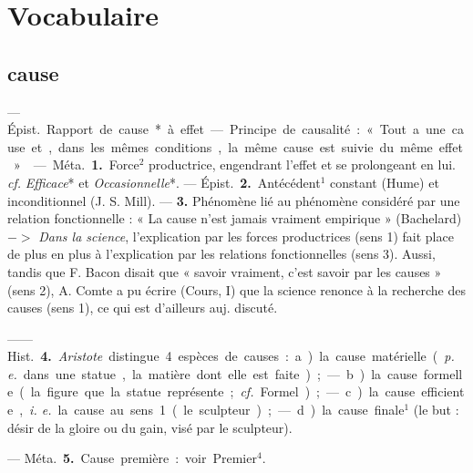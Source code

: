 
\section{Vocabulaire}
\subsection{cause}
	\begin{itemize}[leftmargin=1cm, label=, itemsep=11pt]

 — \si{Épist.} Rapport de cause*
à effet. — Principe de causalité :
« Tout a une cause et, dans les
mêmes conditions, la même cause
est suivie du même effet. »

 — \si{Méta.} {\bf 1.} Force$^2$ productrice,
engendrant l'effet et se prolongeant
en lui. {\it cf.} {\it Efficace}* et {\it Occasionnelle}*. — \si{Épist.} {\bf 2.} Antécédent$^1$
constant (Hume) et inconditionnel
(J. S. Mill). — {\bf 3.} Phénomène lié au
phénomène considéré par une relation fonctionnelle : « La cause n’est
jamais vraiment empirique » (Bachelard) $->$ {\it Dans la science}, l'explication par les forces productrices
(sens 1) fait place de plus en plus à
l’explication par les relations fonctionnelles (sens 3). Aussi, tandis
que F. Bacon disait que « savoir
vraiment, c’est savoir par les causes »
(sens 2), A. Comte a pu écrire
(Cours, I) que la science renonce à
la recherche des causes (sens 1), ce
qui est d'ailleurs auj. discuté.

—— \si{Hist.} {\bf 4.} {\it Aristote} distingue
4 espèces de causes : a) la cause matérielle ({\it p. e.} dans une statue, la
matière dont elle est faite); — b) la
cause formelle (la figure que la statue
représente; {\it cf.} Formel); — c) la
cause efficiente, {\it i. e.} la cause au sens 1
(le sculpteur); — d) la cause finale$^1$
(le but : désir de la gloire ou du gain,
visé par le sculpteur).

— \si{Méta.} {\bf 5.} Cause première : voir
Premier$^4$.

	\end{itemize}
